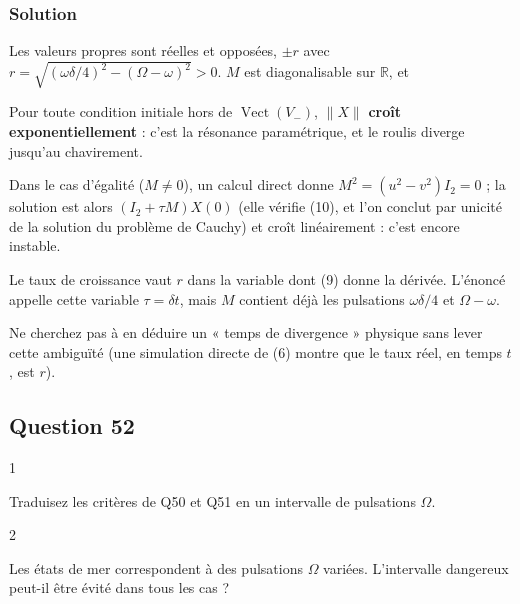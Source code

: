 \documentclass[11pt,a4paper]{article}
\newcommand{\equationajustee}[1]{%
  \sbox{\boiteequation}{$\displaystyle #1$}%
  \ifdim\wd\boiteequation>\linewidth
    \[\resizebox{\linewidth}{!}{\usebox{\boiteequation}}\]%
  \else
    \[#1\]%
  \fi}
\begin{document}
\hypertarget{solution-50}{%
\subsubsection{Solution}\label{solution-50}}

Les valeurs propres sont réelles et opposées, \(\pm r\) avec \(r=\sqrt{(\omega\delta/4)^2-(\Omega-\omega)^2}>0\). \(M\) est diagonalisable sur \(\mathbb{R}\), et

\equationajustee{X(\tau)=c_+e^{r\tau}V_++c_-e^{-r\tau}V_- .}

Pour toute condition initiale hors de \(\operatorname{Vect}(V_-)\), \(\|X\|\) \textbf{croît exponentiellement} : c'est la résonance paramétrique, et le roulis diverge jusqu'au chavirement.

Dans le cas d'égalité (\(M\neq0\)), un calcul direct donne \(M^2=(u^2-v^2)I_2=0\) ; la solution est alors \((I_2+\tau M)X(0)\) (elle vérifie (10), et l'on conclut par unicité de la solution du problème de Cauchy) et croît linéairement : c'est encore instable.

\begin{piege}

Le taux de croissance vaut \(r\) dans la variable dont (9) donne la dérivée. L'énoncé appelle cette variable \(\tau=\delta t\), mais \(M\) contient déjà les pulsations \(\omega\delta/4\) et \(\Omega-\omega\).

Ne cherchez pas à en déduire un « temps de divergence » physique sans lever cette ambiguïté (une simulation directe de (6) montre que le taux réel, en temps \(t\), est \(r\)).

\end{piege}

\hypertarget{question-52}{%
\subsection{Question 52}\label{question-52}}

\begin{indication}{1}

Traduisez les critères de Q50 et Q51 en un intervalle de pulsations \(\Omega\).

\end{indication}

\begin{indication}{2}

Les états de mer correspondent à des pulsations \(\Omega\) variées. L'intervalle dangereux peut-il être évité dans tous les cas ?

\end{indication}
\end{document}
